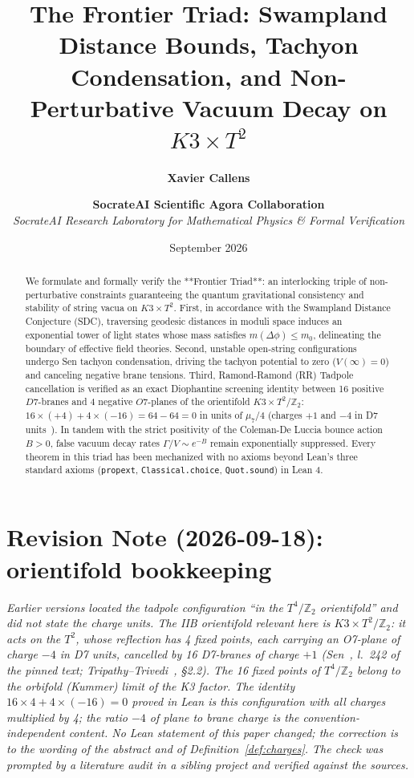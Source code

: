 \documentclass[11pt,a4paper]{article}
\title{\textbf{The Frontier Triad: Swampland Distance Bounds, Tachyon Condensation, and Non-Perturbative Vacuum Decay on $K3 \times T^2$}}
\author{\textbf{Xavier Callens} \and \textbf{SocrateAI Scientific Agora Collaboration} \\
\textit{SocrateAI Research Laboratory for Mathematical Physics \& Formal Verification}}
\date{September 2026}
\begin{document}
\maketitle

\begin{abstract}
We formulate and formally verify the **Frontier Triad**: an interlocking triple of non-perturbative constraints guaranteeing the quantum gravitational consistency and stability of string vacua on $K3 \times T^2$. First, in accordance with the Swampland Distance Conjecture (SDC), traversing geodesic distances in moduli space induces an exponential tower of light states whose mass satisfies $m(\Delta\phi) \le m_0$, delineating the boundary of effective field theories. Second, unstable open-string configurations undergo Sen tachyon condensation, driving the tachyon potential to zero ($V(\infty) = 0$) and canceling negative brane tensions. Third, Ramond-Ramond (RR) Tadpole cancellation is verified as an exact Diophantine screening identity between 16 positive $D7$-branes and 4 negative $O7$-planes of the orientifold $K3 \times T^2/\mathbb{Z}_2$: $16 \times (+4) + 4 \times (-16) = 64 - 64 = 0$ in units of $\mu_7/4$ (charges $+1$ and $-4$ in D7 units~\cite{Sen1996,TripathyTrivedi2003}). In tandem with the strict positivity of the Coleman-De Luccia bounce action $B > 0$, false vacuum decay rates $\Gamma/V \sim e^{-B}$ remain exponentially suppressed. Every theorem in this triad has been mechanized with no axioms beyond Lean's three standard axioms (\texttt{propext}, \texttt{Classical.choice}, \texttt{Quot.sound}) in Lean 4.
\end{abstract}

\section*{Revision Note (2026-09-18): orientifold bookkeeping}
\textit{Earlier versions located the tadpole configuration ``in the $T^4/\mathbb{Z}_2$ orientifold'' and did not state the charge units. The IIB orientifold relevant here is $K3 \times T^2/\mathbb{Z}_2$: it acts on the $T^2$, whose reflection has 4 fixed points, each carrying an O7-plane of charge $-4$ in D7 units, cancelled by 16 D7-branes of charge $+1$ (Sen~\cite{Sen1996}, l.~242 of the pinned text; Tripathy--Trivedi~\cite{TripathyTrivedi2003}, \S2.2). The 16 fixed points of $T^4/\mathbb{Z}_2$ belong to the orbifold (Kummer) limit of the K3 factor. The identity $16 \times 4 + 4 \times (-16) = 0$ proved in Lean is this configuration with all charges multiplied by 4; the ratio $-4$ of plane to brane charge is the convention-independent content. No Lean statement of this paper changed; the correction is to the wording of the abstract and of Definition~\ref{def:charges}. The check was prompted by a literature audit in a sibling project and verified against the sources.}
\end{document}

